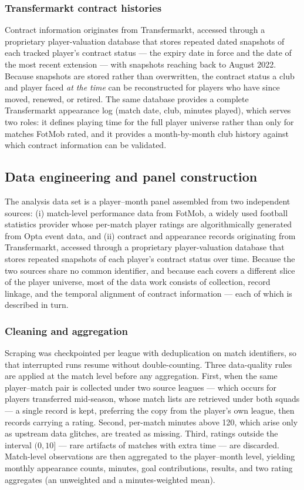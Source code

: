 \documentclass{article}
\begin{document}
\subsubsection{Transfermarkt contract histories}

Contract information originates from Transfermarkt, accessed through a
proprietary player-valuation database that stores repeated dated snapshots of
each tracked player's contract status --- the expiry date in force and the date
of the most recent extension --- with snapshots reaching back to August 2022.
Because snapshots are stored rather than overwritten, the contract status a
club and player faced \emph{at the time} can be reconstructed for players who
have since moved, renewed, or retired. The same database provides a complete
Transfermarkt appearance log (match date, club, minutes played), which serves
two roles: it defines playing time for the full player universe rather than
only for matches FotMob rated, and it provides a month-by-month club history
against which contract information can be validated.

\subsection{Data engineering and panel construction}
\label{sec:data-construction}

The analysis data set is a player--month panel assembled from two
independent sources: (i) match-level performance data from FotMob, a
widely used football statistics provider whose per-match player
ratings are algorithmically generated from Opta event data, and (ii)
contract and appearance records originating from Transfermarkt,
accessed through a proprietary player-valuation database that stores
repeated snapshots of each player's contract status over time.
Because the two sources share no common identifier, and because each
covers a different slice of the player universe, most of the data
work consists of collection, record linkage, and the temporal
alignment of contract information --- each of which is described in
turn.

\subsubsection{Cleaning and aggregation}

Scraping was checkpointed per league with deduplication on match identifiers,
so that interrupted runs resume without double-counting. Three data-quality
rules are applied at the match level before any aggregation. First, when the
same player--match pair is collected under two source leagues --- which occurs
for players transferred mid-season, whose match lists are retrieved under both
squads --- a single record is kept, preferring the copy from the player's own
league, then records carrying a rating. Second, per-match minutes above 120,
which arise only as upstream data glitches, are treated as missing. Third,
ratings outside the interval $(0,10]$ --- rare artifacts of matches with extra
time --- are discarded. Match-level observations are then aggregated to the
player--month level, yielding monthly appearance counts, minutes, goal
contributions, results, and two rating aggregates (an unweighted and a
minutes-weighted mean).
\end{document}
